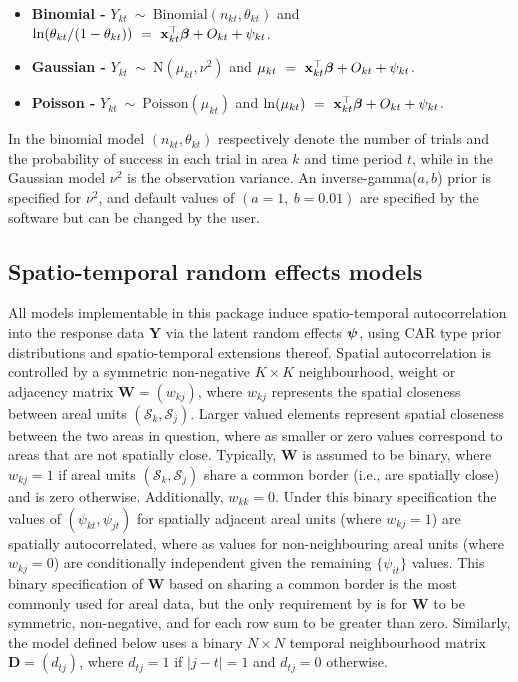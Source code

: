 \documentclass[article, nojss]{jss}
\newcommand{\bd}[1]{\ensuremath{\mbox{\boldmath $#1$}}}
\begin{document}
\begin{itemize}
\item \textbf{Binomial - } $Y_{kt}~\sim~\mbox{Binomial}(n_{kt}, \theta_{kt})$ and $\ln(\theta_{kt}/(1-\theta_{kt}))~=~\mathbf{x}_{kt}^{\top}\bd{\beta} + O_{kt} + \psi_{kt}$. 

\item \textbf{Gaussian - } $Y_{kt}~\sim~\mbox{N}(\mu_{kt}, \nu^{2})$ and $\mu_{kt}~=~\mathbf{x}_{kt}^{\top}\bd{\beta} + O_{kt} + \psi_{kt}$. 

\item \textbf{Poisson - } $Y_{kt}~\sim~\mbox{Poisson}(\mu_{kt})$ and $\ln(\mu_{kt})~=~\mathbf{x}_{kt}^{\top}\bd{\beta} + O_{kt} + \psi_{kt}$. 
\end{itemize}

In the binomial model $(n_{kt}, \theta_{kt})$ respectively denote the number of trials and the probability of success in each trial in area $k$ and time period $t$, while in the Gaussian model $\nu^2$ is the observation variance. An inverse-gamma($a,b$) prior is specified for $\nu^2$, and default values of $(a=1,~ b=0.01)$  are specified by the software but can be changed by the user.


\subsection{Spatio-temporal random effects models}
All models implementable in this package induce spatio-temporal autocorrelation into the response data $\mathbf{Y}$ via the latent random effects $\bd{\psi}$, using CAR type prior distributions and spatio-temporal extensions thereof. Spatial autocorrelation is controlled by a symmetric non-negative $K\times K$ neighbourhood, weight or adjacency matrix $\mathbf{W}=(w_{kj})$, where $w_{kj}$ represents the spatial closeness between areal units $(\mathcal{S}_k, \mathcal{S}_j)$. Larger valued elements represent spatial closeness between the two areas in question, where as smaller or zero values correspond to areas that are not spatially close. Typically, $\mathbf{W}$ is assumed to be binary, where $w_{kj}=1$ if areal units $(\mathcal{S}_k, \mathcal{S}_j)$ share a common border (i.e., are spatially close) and is zero otherwise. Additionally, $w_{kk}=0$. Under this binary specification the values of $(\psi_{kt}, \psi_{jt})$ for spatially adjacent areal units (where $w_{kj}=1$) are spatially autocorrelated, where as values for non-neighbouring areal units (where $w_{kj}=0$) are conditionally independent given the remaining $\{\psi_{it}\}$ values. This binary specification of $\mathbf{W}$ based on sharing a common border is the most commonly used for areal data, but the only requirement by  is for $\mathbf{W}$ to be symmetric, non-negative, and for each row sum to be greater than zero. Similarly, the model  defined below uses a binary $N\times N$ temporal neighbourhood matrix $\mathbf{D}=(d_{tj})$, where $d_{tj}=1$ if $|j-t|=1$ and $d_{tj}=0$ otherwise.\\ 
\end{document}
